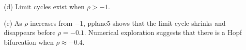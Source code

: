 \documentclass{ximera}
\begin{document}
\begin{exercise}
\begin{solution}
(d) Limit cycles exist when $\rho>-1$.

(e)  As $\rho$ increases from $-1$, {\sf pplane5} shows that the limit 
cycle shrinks and disappears before $\rho=-0.1$. Numerical exploration
suggests that there is a Hopf bifurcation when $\rho\approx -0.4$.

\begin{figure}[htb]
                       \centerline{%
                       }
\end{figure}


\end{solution}
\end{exercise}
\end{document}
